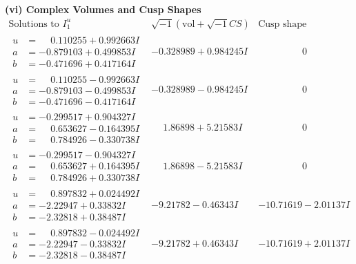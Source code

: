 \documentclass[1p]{elsarticle_modified}
\theoremstyle{definition}
\newcommand{\I}{\sqrt{-1}}
\begin{document}
\newpage\flushleft \textbf{(vi) Complex Volumes and Cusp Shapes}
$$\begin{array}{c|c|c}  
\text{Solutions to }I^u_{1}& \I (\text{vol} + \sqrt{-1}CS) & \text{Cusp shape}\\
 \hline 
\begin{aligned}
u &= \phantom{-}0.110255 + 0.992663 I \\
a &= -0.879103 + 0.499853 I \\
b &= -0.471696 + 0.417164 I\end{aligned}
 & -0.328989 + 0.984245 I & \phantom{-0.000000 } 0 \\ \hline\begin{aligned}
u &= \phantom{-}0.110255 - 0.992663 I \\
a &= -0.879103 - 0.499853 I \\
b &= -0.471696 - 0.417164 I\end{aligned}
 & -0.328989 - 0.984245 I & \phantom{-0.000000 } 0 \\ \hline\begin{aligned}
u &= -0.299517 + 0.904327 I \\
a &= \phantom{-}0.653627 - 0.164395 I \\
b &= \phantom{-}0.784926 - 0.330738 I\end{aligned}
 & \phantom{-}1.86898 + 5.21583 I & \phantom{-0.000000 } 0 \\ \hline\begin{aligned}
u &= -0.299517 - 0.904327 I \\
a &= \phantom{-}0.653627 + 0.164395 I \\
b &= \phantom{-}0.784926 + 0.330738 I\end{aligned}
 & \phantom{-}1.86898 - 5.21583 I & \phantom{-0.000000 } 0 \\ \hline\begin{aligned}
u &= \phantom{-}0.897832 + 0.024492 I \\
a &= -2.22947 + 0.33832 I \\
b &= -2.32818 + 0.38487 I\end{aligned}
 & -9.21782 - 0.46343 I & -10.71619 - 2.01137 I \\ \hline\begin{aligned}
u &= \phantom{-}0.897832 - 0.024492 I \\
a &= -2.22947 - 0.33832 I \\
b &= -2.32818 - 0.38487 I\end{aligned}
 & -9.21782 + 0.46343 I & -10.71619 + 2.01137 I \\ \hline\begin{aligned}

\end{aligned}
\end{array}$$
\end{document}
